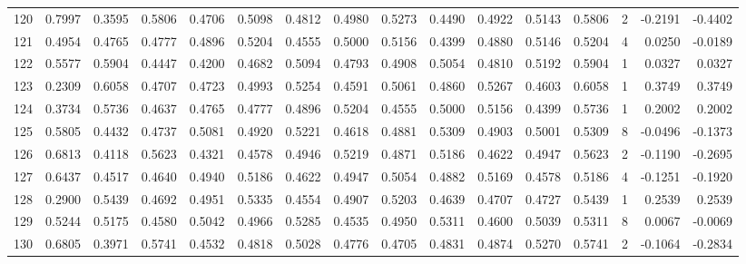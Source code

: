 \begin{tabular}{lrrrrrrrrrrrrrrr}
120 &      0.7997 &  0.3595 &  0.5806 &  0.4706 &  0.5098 &  0.4812 &  0.4980 &  0.5273 &  0.4490 &  0.4922 &   0.5143 &     0.5806 &      2 &                   -0.2191 &                    -0.4402 \\
121 &      0.4954 &  0.4765 &  0.4777 &  0.4896 &  0.5204 &  0.4555 &  0.5000 &  0.5156 &  0.4399 &  0.4880 &   0.5146 &     0.5204 &      4 &                    0.0250 &                    -0.0189 \\
122 &      0.5577 &  0.5904 &  0.4447 &  0.4200 &  0.4682 &  0.5094 &  0.4793 &  0.4908 &  0.5054 &  0.4810 &   0.5192 &     0.5904 &      1 &                    0.0327 &                     0.0327 \\
123 &      0.2309 &  0.6058 &  0.4707 &  0.4723 &  0.4993 &  0.5254 &  0.4591 &  0.5061 &  0.4860 &  0.5267 &   0.4603 &     0.6058 &      1 &                    0.3749 &                     0.3749 \\
124 &      0.3734 &  0.5736 &  0.4637 &  0.4765 &  0.4777 &  0.4896 &  0.5204 &  0.4555 &  0.5000 &  0.5156 &   0.4399 &     0.5736 &      1 &                    0.2002 &                     0.2002 \\
125 &      0.5805 &  0.4432 &  0.4737 &  0.5081 &  0.4920 &  0.5221 &  0.4618 &  0.4881 &  0.5309 &  0.4903 &   0.5001 &     0.5309 &      8 &                   -0.0496 &                    -0.1373 \\
126 &      0.6813 &  0.4118 &  0.5623 &  0.4321 &  0.4578 &  0.4946 &  0.5219 &  0.4871 &  0.5186 &  0.4622 &   0.4947 &     0.5623 &      2 &                   -0.1190 &                    -0.2695 \\
127 &      0.6437 &  0.4517 &  0.4640 &  0.4940 &  0.5186 &  0.4622 &  0.4947 &  0.5054 &  0.4882 &  0.5169 &   0.4578 &     0.5186 &      4 &                   -0.1251 &                    -0.1920 \\
128 &      0.2900 &  0.5439 &  0.4692 &  0.4951 &  0.5335 &  0.4554 &  0.4907 &  0.5203 &  0.4639 &  0.4707 &   0.4727 &     0.5439 &      1 &                    0.2539 &                     0.2539 \\
129 &      0.5244 &  0.5175 &  0.4580 &  0.5042 &  0.4966 &  0.5285 &  0.4535 &  0.4950 &  0.5311 &  0.4600 &   0.5039 &     0.5311 &      8 &                    0.0067 &                    -0.0069 \\
130 &      0.6805 &  0.3971 &  0.5741 &  0.4532 &  0.4818 &  0.5028 &  0.4776 &  0.4705 &  0.4831 &  0.4874 &   0.5270 &     0.5741 &      2 &                   -0.1064 &                    -0.2834 \\

\end{tabular}
